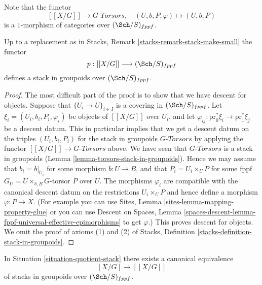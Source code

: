 \medskip\noindent
Note that the functor
$$
[[X/G]] \longrightarrow G\textit{-Torsors},
\quad
(U, b, P, \varphi) \longmapsto (U, b, P)
$$
is a $1$-morphism of categories over $(\Sch/S)_{fppf}$.

\begin{lemma}
\label{lemma-group-quotient-stack-in-groupoids}
Up to a replacement as in
Stacks, Remark \ref{stacks-remark-stack-make-small}
the functor
$$
p : [[X/G]] \longrightarrow (\Sch/S)_{fppf}
$$
defines a stack in groupoids over $(\Sch/S)_{fppf}$.
\end{lemma}

\begin{proof}
The most difficult part of the proof is to show that we have descent for
objects. Suppose that $\{U_i \to U\}_{i \in I}$ is a covering in
$(\Sch/S)_{fppf}$. Let
$\xi_i = (U_i, b_i, P_i, \varphi_i)$ be objects of $[[X/G]]$ over $U_i$,
and let $\varphi_{ij} : \text{pr}_0^*\xi_i \to \text{pr}_1^*\xi_j$
be a descent datum. This in particular implies that we get a descent
datum on the triples $(U_i, b_i, P_i)$ for the stack in groupoids
$G\textit{-Torsors}$ by applying the functor
$[[X/G]] \to G\textit{-Torsors}$ above. We have seen that
$G\textit{-Torsors}$ is a stack in groupoids
(Lemma \ref{lemma-torsors-stack-in-groupoids}).
Hence we may assume that $b_i = b|_{U_i}$ for some morphism $b : U \to B$, and
that $P_i = U_i \times_U P$ for some fppf $G_U = U \times_{b, B} G$-torsor
$P$ over $U$. The morphisms $\varphi_i$ are compatible
with the canonical descent datum on the restrictions $U_i \times_U P$
and hence define a morphism $\varphi : P \to X$. (For example you
can use
Sites, Lemma \ref{sites-lemma-mapping-property-glue}
or you can use
Descent on Spaces,
Lemma \ref{spaces-descent-lemma-fppf-universal-effective-epimorphisms}
to get $\varphi$.)
This proves descent for objects.
We omit the proof of axioms (1) and (2) of
Stacks, Definition \ref{stacks-definition-stack-in-groupoids}.
\end{proof}

\begin{proposition}
\label{proposition-equal-quotient-stacks}
In
Situation \ref{situation-quotient-stack}
there exists a canonical equivalence
$$
[X/G] \longrightarrow [[X/G]]
$$
of stacks in groupoids over $(\Sch/S)_{fppf}$.
\end{proposition}

